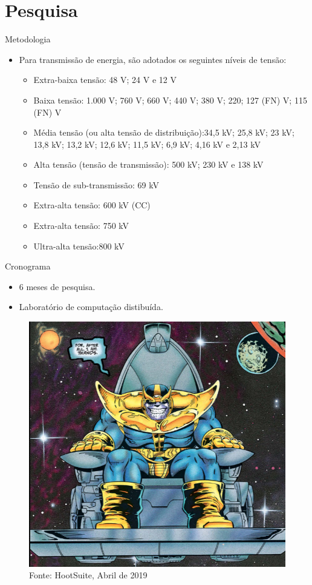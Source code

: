 \section{Pesquisa}
\begin{frame}{Metodologia}
\begin{itemize}
		\item Para transmissão de energia, são adotados os seguintes níveis de tensão:
		\begin{itemize}
			\item Extra-baixa tensão: 48 V; 24 V e 12 V
			\item  Baixa tensão: 1.000 V; 760 V; 660 V; 440 V; 380 V; 220; 127 (FN) V; 115 (FN) V
			\item  Média tensão (ou alta tensão de distribuição):34,5 kV; 25,8 kV; 23 kV; 13,8 kV; 13,2 kV; 12,6 kV; 11,5 kV; 6,9 kV; 4,16 kV e 2,13 kV
			\item  Alta tensão (tensão de transmissão): 500 kV; 230 kV e 138 kV
			\item  Tensão de sub-transmissão: 69 kV
			\item  Extra-alta tensão: 600 kV (CC)
			\item  Extra-alta tensão: 750 kV
			\item  Ultra-alta tensão:800 kV
		\end{itemize}
	\end{itemize} 
\end{frame}

\begin{frame}{Cronograma}
\begin{itemize}
		\item 6 meses de pesquisa.
		\item Laboratório de computação distibuída.
	\end{itemize} 
	\begin{figure}
		\caption{}
		\includegraphics[width = 0.65\linewidth]{img/lorem-picsum.jpg}\\
		\tiny Fonte: HootSuite, Abril de 2019
	\end{figure}
\end{frame}

